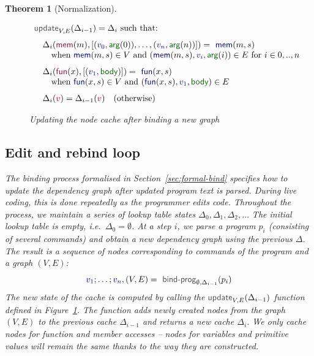 \documentclass[acmsmall,anonymous,fleqn]{acmart}\settopmatter{printfolios=false,printccs=false,printacmref=false}
\newcounter{thc}
\theoremstyle{plain}
\newtheorem{theorem}[thc]{Theorem}
\theoremstyle{definition}
\newcommand{\ident}[1]{\textnormal{\textcolor{idclr}{\sffamily #1}}}
\newcommand{\bndclr}[1]{\textcolor{kvdclr}{#1}}
\newcommand{\bkndclr}[1]{\textcolor{prepclr}{#1}}
\newcommand{\bnd}[1]{\textnormal{\textcolor{kvdclr}{\sffamily #1}}}
\newcommand{\bknd}[1]{\textnormal{\textcolor{prepclr}{\sffamily #1}}}
\newcommand{\blbl}[1]{\textnormal{\textcolor{numclr}{\sffamily #1}}}
\begin{document}
\begin{theorem}[Normalization]

\begin{figure}
\begin{equation*}
\begin{array}{l}
\ident{update}_{V,E}(\Delta_{i-1}) = \Delta_i~\textnormal{such that:}
\\[0.75em]
\quad\Delta_{i}(\bknd{mem}(m), [(\bndclr{v_0},\blbl{arg}(0)),\ldots, (\bndclr{v_n},\blbl{arg}(n))]) = \bnd{mem}(m, s)\\
\quad\quad \textnormal{when}~\bnd{mem}(m, s) \in V
~\textnormal{and}~(\bnd{mem}(m, s), \bndclr{v_i}, \blbl{arg}(i)) \in E~\textnormal{for}~i\in 0,..,n
\\[0.75em]
\quad\Delta_{i}(\bknd{fun}(x), [(\bndclr{v_1},\blbl{body})]) = \bnd{fun}(x, s)\\
\quad\quad \textnormal{when}~\bnd{fun}(x, s) \in V
~\textnormal{and}~(\bnd{fun}(x, s), \bndclr{v_1}, \blbl{body}) \in E
\\[0.75em]
\quad\Delta_{i}(\bkndclr{v}) = \Delta_{i-1}(\bkndclr{v})\quad \textnormal{(otherwise)}
\end{array}
\end{equation*}
\vspace{-1em}
\caption{Updating the node cache after binding a new graph}
\label{fig:loop}
\vspace{-0.5em}
\end{figure}


\subsection{Edit and rebind loop}

The binding process formalised in Section~\ref{sec:formal-bind} specifies how to update the
dependency graph after updated program text is parsed. During live coding, this is done
repeatedly as the programmer edits code. Throughout the process, we maintain a series of
lookup table states $\Delta_0, \Delta_1, \Delta_2, \ldots$ The initial lookup table is
empty, i.e.~$\Delta_0 = \emptyset$. At a step $i$, we parse a program $p_i$ (consisting of
several commands) and obtain a new dependency graph using the previous $\Delta$. The result is
a sequence of nodes corresponding to commands of the program and a graph $(V, E)$:
%
\begin{equation*}
\bndclr{v_1}; \ldots; \bndclr{v_n}, (V, E) = \ident{bind-prog}_{\emptyset, \Delta_{i-1}}(p_i)
\end{equation*}
%
The new state of the cache is computed by calling the $\ident{update}_{V, E}(\Delta_{i-1})$ function
defined in Figure~\ref{fig:loop}. The function adds newly created nodes from the graph
$(V, E)$ to the previous cache $\Delta_{i-1}$ and returns a new cache $\Delta_{i}$. We only cache
nodes for function and member accesses -- nodes for variables and primitive values will remain
the same thanks to the way they are constructed.


\end{theorem}
\end{document}
